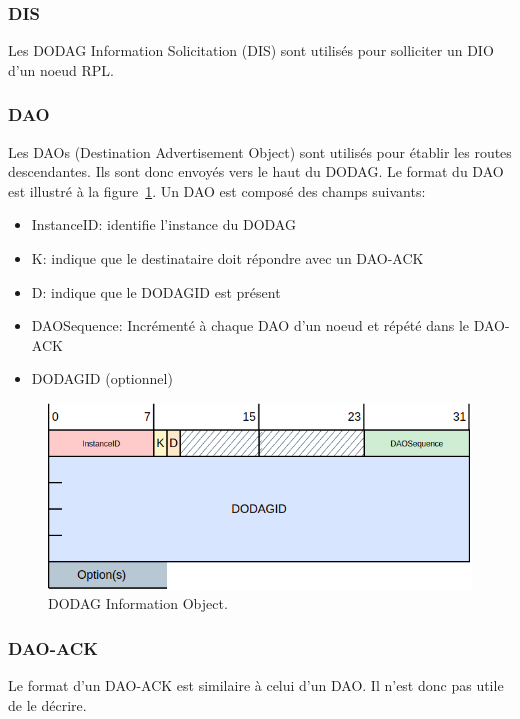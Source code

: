 \subsubsection*{DIS}
    Les DODAG Information Solicitation (DIS) sont utilisés pour solliciter un DIO d'un noeud RPL.

\subsubsection*{DAO}%
    Les DAOs (Destination Advertisement Object) sont utilisés pour établir les routes descendantes.
    Ils sont donc envoyés vers le haut du DODAG. Le format du DAO est illustré à la figure~\ref{fig:state-dao}. Un DAO est composé des champs suivants:
    \begin{itemize}
        \item InstanceID: identifie l'instance du DODAG
        \item K: indique que le destinataire doit répondre avec un DAO-ACK
        \item D: indique que le DODAGID est présent
        \item DAOSequence: Incrémenté à chaque DAO d'un noeud et répété dans le DAO-ACK
        \item DODAGID (optionnel)
    \end{itemize}
    \begin{figure}[H]
        \centering
        \includegraphics[scale=0.5]{res/pictures/dao.drawio.png}
        \caption{DODAG Information Object.}
        \label{fig:state-dao}
    \end{figure}

\subsubsection*{DAO-ACK}
    Le format d'un DAO-ACK est similaire à celui d'un DAO. Il n'est donc pas utile de le décrire.

